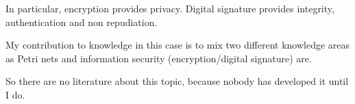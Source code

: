 In particular, encryption provides privacy. Digital signature provides
integrity, authentication and non repudiation. 


My contribution to knowledge in this case is to mix two different
knowledge areas as Petri nets
and information security (encryption/digital signature) are.

So there are no literature about this topic, because nobody has developed it until I do.   


   

